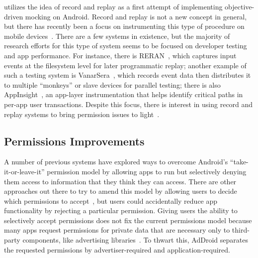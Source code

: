 \PocketMocker{} utilizes the idea of record and replay as a first attempt of
implementing objective-driven mocking on Android. Record and replay is not a
new concept in general, but there has recently been a focus on instrumenting
this type of procedure on mobile devices~\cite{recordreplay-hotmobile11}.
There are a few systems in existence, but the majority of research efforts
for this type of system seems to be focused on developer testing and app
performance. For instance, there is RERAN~\cite{gomez2013reran}, which
captures input events at the filesystem level for later programmatic replay;
another example of such a testing system is
VanarSera~\cite{vanarsena-mobisys14}, which records event data then
distributes it to multiple ``monkeys'' or slave devices for parallel testing;
there is also AppInsight~\cite{appinsight-osdi12}, an app-layer
instrumentation that helps identify critical paths in per-app user
transactions. Despite this focus, there is interest in using record and
replay systems to bring permission issues to light~\cite{permissions-spsm12}.


\subsection{Permissions Improvements}

A number of previous systems have explored ways to overcome Android's
``take-it-or-leave-it'' permission model by allowing apps to run but
selectively denying them access to information that they think they can
access. There are other approaches out there to try to amend this model by
allowing users to decide which permissions to accept~\cite{apex-asiaccs10},
but users could accidentally reduce app functionality by rejecting a
particular permission. Giving users the ability to selectively accept
permissions does not fix the current permissions model because many
apps request permissions for private data that are necessary only to
third-party components, like advertising libraries~\cite{addroid-asiaccs12}.
To thwart this, AdDroid separates the requested permissions by
advertiser-required and application-required.
